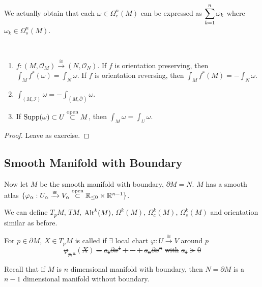 \begin{remark}\label{Remark:Every form with compact support can be expressed as the sum of form with small support}
   We actually obtain that each  $ \omega\in \Omega_c^n(M) $ can be expressed as  $ \displaystyle\sum_{k=1}^n\omega_k $ where  $ \omega_k\in\Omega_s^n(M) $.   
\end{remark}
\begin{proposition}
   \,
   \begin{enumerate}
       \item  $ f:(M,\mathcal{O}_M)\xrightarrow{\cong}(N,\mathcal{O}_N) $. If  $ f $ is orientation preserving, then  $ \int_Mf^*(\omega)=\int_N\omega $. If  $ f $ is orientation reversing, then  $ \int_Mf^*(M)=-\int_N\omega $. 
       \item  $ \int_{(M,\mathcal{I})}\omega=-\int_{(M,\overline{\mathcal{O}})}\omega $.
       \item If  $ \mathrm{Supp}(\omega)\subset U\overset{\text{open}}{\subset} M $, then  $ \int_M\omega=\int_U\omega $.       
   \end{enumerate}
\end{proposition}
\begin{proof}
   Leave as exercise.
\end{proof}

\subsection{Smooth Manifold with Boundary}
Now let  $ M $ be the smooth manifold with boundary,  $ \partial M=N $. \ie  $ M $ has a smooth atlas  $ \{\varphi_\alpha:U_\alpha\xrightarrow{\cong}V_\alpha\overset{\text{open}}{\subset}\mathbb R_{\leq 0}\times\mathbb R^{n-1}\} $.

We can define  $ T_pM $,  $ TM $, $ \mathrm{Alt}^k(M) $, $ \Omega^k(M) $,  $ \Omega_c^k(M) $,  $ \Omega_s^k(M) $ and orientation similar as before.

For  $ p\in\partial M $,  $ X\in T_pM $ is called   if  $ \exists $ local chart  $ \varphi:U\xrightarrow{\cong}V $ around  $ p $ \st 
\[\varphi_{p,*}(X)=a_1\partial x^1+\cdots+a_n\partial x^n\text{ with }a_1>0\]   

Recall that if  $ M $ is  $ n $ dimensional manifold with boundary, then  $ N=\partial M $ is a  $ n-1 $ dimensional manifold without boundary.  

